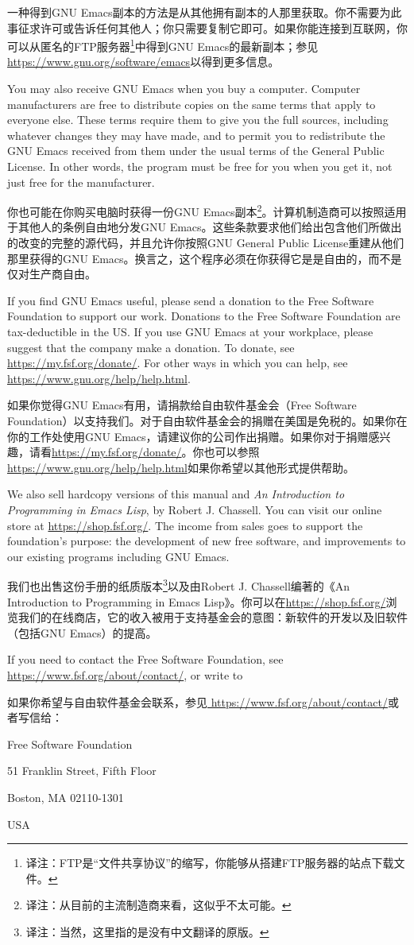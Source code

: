 一种得到GNU Emacs副本的方法是从其他拥有副本的人那里获取。你不需要为此事征求许可或告诉任何其他人；你只需要复制它即可。如果你能连接到互联网，你可以从匿名的FTP服务器\footnote{译注：FTP是“文件共享协议”的缩写，你能够从搭建FTP服务器的站点下载文件。}中得到GNU Emacs的最新副本；参见\url{https://www.gnu.org/software/emacs}以得到更多信息。\par
You may also receive GNU Emacs when you buy a computer. Computer manufacturers are free to distribute copies on the same terms that apply to everyone else. These terms require them to give you the full sources, including whatever changes they may have made, and to permit you to redistribute the GNU Emacs received from them under the usual terms of the General Public License. In other words, the program must be free for you when you get it, not just free for the manufacturer.\par
你也可能在你购买电脑时获得一份GNU Emacs副本\footnote{译注：从目前的主流制造商来看，这似乎不太可能。}。计算机制造商可以按照适用于其他人的条例自由地分发GNU Emacs。这些条款要求他们给出包含他们所做出的改变的完整的源代码，并且允许你按照GNU General Public License重建从他们那里获得的GNU Emacs。换言之，这个程序必须在你获得它是是自由的，而不是仅对生产商自由。\par
If you find GNU Emacs useful, please send a donation to the Free Software Foundation to support our work. Donations to the Free Software Foundation are tax-deductible in the US. If you use GNU Emacs at your workplace, please suggest that the company make a donation. To donate, see \url{https://my.fsf.org/donate/}. For other ways in which you can help, see \url{https://www.gnu.org/help/help.html}.\par
如果你觉得GNU Emacs有用，请捐款给自由软件基金会（Free Software Foundation）以支持我们。对于自由软件基金会的捐赠在美国是免税的。如果你在你的工作处使用GNU Emacs，请建议你的公司作出捐赠。如果你对于捐赠感兴趣，请看\url{https://my.fsf.org/donate/}。你也可以参照\url{https://www.gnu.org/help/help.html}如果你希望以其他形式提供帮助。\par
We also sell hardcopy versions of this manual and \textit{An Introduction to Programming in Emacs Lisp}, by Robert J. Chassell. You can visit our online store at \url{https://shop.fsf.org/}. The income from sales goes to support the foundation’s purpose: the development of new free software, and improvements to our existing programs including GNU Emacs.\par
我们也出售这份手册的纸质版本\footnote{译注：当然，这里指的是没有中文翻译的原版。}以及由Robert J. Chassell编著的《An Introduction to Programming in Emacs Lisp》。你可以在\url{https://shop.fsf.org/}浏览我们的在线商店，它的收入被用于支持基金会的意图：新软件的开发以及旧软件（包括GNU Emacs）的提高。\par
If you need to contact the Free Software Foundation, see\url{ https://www.fsf.org/about/contact/}, or write to\par
如果你希望与自由软件基金会联系，参见\url{ https://www.fsf.org/about/contact/}或者写信给：\par
Free Software Foundation\par
51 Franklin Street, Fifth Floor\par
Boston, MA 02110-1301\par
USA
